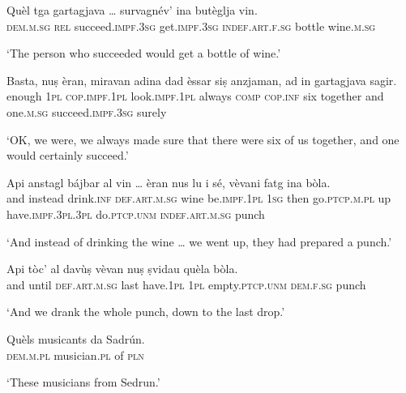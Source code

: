 \begin{linenumbers}
\gll    Quèl tga gartagjava … survagnév’ ina butèglja vin.\\
\textsc{dem.m.sg} \textsc{rel} succeed.\textsc{impf.3sg} {} get.\textsc{impf.3sg} \textsc{indef.art.f.sg} bottle wine.\textsc{m.sg}\\
\end{linenumbers}
\medskip
\glt `The person who succeeded would get a bottle of wine.'
\medskip

\begin{linenumbers}
	\gll  Basta, nuṣ èran, miravan adina dad èssar siṣ anzjaman, ad in gartagjava sagir.\\
	enough \textsc{1pl} \textsc{cop.impf.1pl} look.\textsc{impf.1pl} always \textsc{comp}  \textsc{cop.inf} six together and one.\textsc{m.sg} succeed.\textsc{impf.3sg} surely \\
\end{linenumbers}
\medskip
\glt `OK, we were, we always made sure that there were six of us together, and one would certainly succeed.'
\medskip

\begin{linenumbers}
	\gll    Api anstagl bájbar al vin … èran nus lu i sé, vèvani fatg ina bòla.\\
	and instead drink.\textsc{inf} \textsc{def.art.m.sg} wine {} be.\textsc{impf.1pl} \textsc{1sg} then go.\textsc{ptcp.m.pl} up have.\textsc{impf.3pl.3pl} do.\textsc{ptcp.unm} \textsc{indef.art.m.sg} punch \\
\end{linenumbers}
\medskip
\glt `And instead of drinking the wine … we went up, they had prepared a punch.'
\medskip

\begin{linenumbers}
	\gll    Api tòc’ al davùṣ vèvan nuṣ ṣvidau quèla bòla.\\
	and until \textsc{def.art.m.sg} last have.\textsc{1pl} \textsc{1pl} empty.\textsc{ptcp.unm} \textsc{dem.f.sg} punch \\
\end{linenumbers}
\medskip
\glt `And we drank the whole punch, down to the last drop.'
\medskip

\begin{linenumbers}
\gll    Quèls musicants da Sadrún.\\
\textsc{dem.m.pl} musician.\textsc{pl} of \textsc{pln}\\
\end{linenumbers}
\medskip 
\glt `These musicians from Sedrun.'
\medskip

